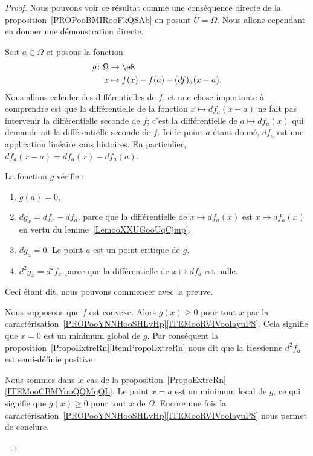 \begin{proof}
	Nous pouvons voir ce résultat comme une conséquence directe de la proposition~\ref{PROPooBMIRooFkQSAb} en posant \( U=\Omega\). Nous allons cependant en donner une démonstration directe.

	Soit \( a\in \Omega\) et posons la fonction
	\begin{equation}
		\begin{aligned}
			g\colon \Omega & \to \eR                        \\
			x              & \mapsto f(x)-f(a)-(df)_a(x-a).
		\end{aligned}
	\end{equation}
	Nous allons calculer des différentielles de \( f\), et une chose importante à comprendre est que la différentielle de la fonction \( x\mapsto df_a(x-a)\) ne fait pas intervenir la différentielle seconde de \( f\); c'est la différentielle de \( a\mapsto df_a(x)\) qui demanderait la différentielle seconde de \( f\). Ici le point \( a\) étant donné, \( df_a\) est une application linéaire sans histoires. En particulier, \( df_a(x-a)=df_a(x)-df_a(a)\).

	La fonction \( g\) vérifie :
	\begin{enumerate}
		\item
		      \( g(a)=0\),
		\item
		      \( dg_x=df_x-df_a\), parce que la différentielle de \( x\mapsto df_a(x)\) est \( x\mapsto df_a(x)\) en vertu du lemme~\ref{LemooXXUGooUqCjmp}.
		\item
		      \( dg_a=0\). Le point \( a\) est un point critique de \( g\).
		\item
		      \( d^2g_x=d^2f_x\) parce que la différentielle de \( x\mapsto df_a\) est nulle.
	\end{enumerate}
	Ceci étant dit, nous pouvons commencer avec la preuve.
	\begin{subproof}

		Nous supposons que \( f\) est convexe. Alors \( g(x)\geq 0\) pour tout \( x\) par la caractérisation~\ref{PROPooYNNHooSHLvHp}\ref{ITEMooRVIVooIayuPS}. Cela signifie que \( x=0\) est un minimum global de \( g\). Par conséquent la proposition~\ref{PropoExtreRn}\ref{ItemPropoExtreRn} nous dit que la Hessienne \( d^2f_a\) est semi-définie positive.


		Nous sommes dans le cas de la proposition~\ref{PropoExtreRn}\ref{ITEMooCBMYooQQMqQL}. Le point \( x=a\) est un minimum local de \( g\), ce qui signifie que \( g(x)\geq 0\) pour tout \( x\) de \( \Omega\). Encore une fois la caractérisation~\ref{PROPooYNNHooSHLvHp}\ref{ITEMooRVIVooIayuPS} nous permet de conclure.


\end{subproof}
\end{proof}
